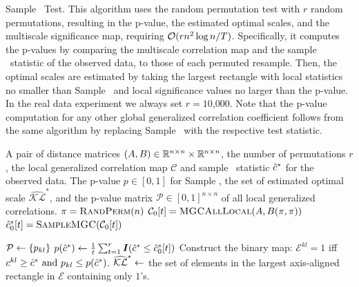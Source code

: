 \documentclass[11pt]{article}
\begin{document}
\clearpage

\begin{algorithm}
\caption{Sample \Mgc~Test. 
This algorithm uses the random permutation test with $r$ random permutations, resulting in the p-value, the estimated optimal scales, and the multiscale significance map, requiring $\mathcal{O}(rn^2 \log n/T)$. Specifically, it computes the p-values by comparing the multiscale correlation map and the sample \Mgc~statistic of the observed data, to those of each permuted resample.  Then, the optimal scales are estimated by taking the largest rectangle with local statistics no smaller than Sample \Mgc~and local significance values no larger than the p-value.  In the real data experiment we always set $r=10$,$000$. Note that the p-value computation for any other global generalized correlation coefficient follows from the same algorithm by replacing Sample \Mgc~with the respective test statistic.
}
\label{alg:pval}
\begin{algorithmic}[1]
\Require A pair of distance matrices $(A, B) \in \mathbb{R}^{n \times n} \times \mathbb{R}^{n \times n}$, the number of permutations $r$, the local generalized correlation map $\mathcal{C}$ and sample \Mgc~statistic $\hat{c}^*$ for the observed data.
\Ensure The p-value $p \in [0,1]$ for Sample \Mgc, the set of estimated optimal scale $\widehat{\mathcal{KL}}^{*}$, and the p-value matrix $\mathcal{P} \in [0,1]^{n \times n}$ of all local generalized correlations.
\State $\pi=\textsc{RandPerm}(n)$  
\State $\mathcal{C}_{0}[t]=\textsc{MGCAllLocal}(A, B(\pi,\pi))$ 
\State $\hat{c}^{*}_{0}[t]=\textsc{SampleMGC}(\mathcal{C}_{0}[t])$ 
\EndFor

  $\mathcal{P} \leftarrow \{ p_{kl} \}$
\State $p(\hat{c}^*) \leftarrow \frac{1}{t}\sum_{t=1}^{r}\boldsymbol{I}(\hat{c}^{*} \leq \hat{c}^{*}_{0}[t])$  
\State Construct the binary map:    $\mathcal{E}^{kl} = 1 $ iff $  c^{kl} \geq \hat{c}^{*} \mbox{ and } p_{kl} \leq p(\hat{c}^*)$. 
\State $\widehat{\mathcal{KL}}^{*} \leftarrow $ the set of elements in the largest axis-aligned rectangle in $\mathcal{E}$ containing only $1$'s.

\EndFunction
\end{algorithmic}
\end{algorithm}
\end{document}
